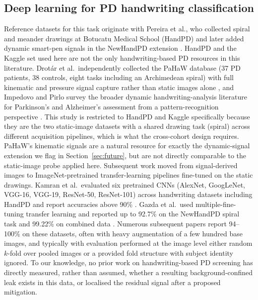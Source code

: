 \documentclass[3p,final,10pt]{elsarticle}
\let\oldsubsection\subsection
\renewcommand{\subsection}{\FloatBarrier\oldsubsection}
\begin{document}
\subsection{Deep learning for PD handwriting classification}
Reference datasets for this task originate with Pereira et al., who
collected spiral and meander drawings at Botucatu Medical School (HandPD)
and later added dynamic smart-pen signals in the NewHandPD extension
\cite{pereira2015,pereira2016newhandpd}. HandPD and the Kaggle set used
here are not the only handwriting-based PD resources in this literature.
Drotár et al.\ independently collected the PaHaW database (37 PD patients,
38 controls, eight tasks including an Archimedean spiral) with full
kinematic and pressure signal capture rather than static images alone
\cite{drotar2016pahaw}, and Impedovo and Pirlo survey the broader dynamic
handwriting-analysis literature for Parkinson's and Alzheimer's assessment
from a pattern-recognition perspective \cite{impedovo2019}. This study is
restricted to HandPD and Kaggle specifically because they are the two
static-image datasets with a shared drawing task (spiral) across
different acquisition pipelines, which is what the cross-cohort design
requires. PaHaW's kinematic signals are a natural resource for exactly the
dynamic-signal extension we flag in Section~\ref{sec:future}, but are not
directly comparable to the static-image probe applied here. Subsequent
work moved from signal-derived images to ImageNet-pretrained
transfer-learning pipelines fine-tuned on the static drawings. Kamran et
al.\ evaluated six pretrained CNNs (AlexNet, GoogLeNet, VGG-16, VGG-19,
ResNet-50, ResNet-101) across handwriting datasets including HandPD and
report accuracies above 90\% \cite{kamran2021}. Gazda et al.\ used
multiple-fine-tuning transfer learning and reported up to 92.7\% on the
NewHandPD spiral task and 99.22\% on combined data \cite{gazda2022}.
Numerous subsequent papers report 94--100\% on these datasets, often with
heavy augmentation of a few hundred base images, and typically with
evaluation performed at the image level either random $k$-fold over
pooled images or a provided fold structure with subject identity
ignored. To our knowledge, no prior work on handwriting-based PD screening
has directly measured, rather than assumed, whether a resulting
background-confined leak exists in this data, or localised the residual
signal after a proposed mitigation.
\end{document}
